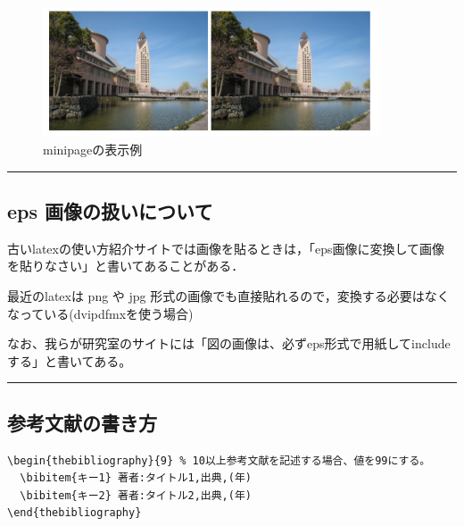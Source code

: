 \begin{figure}[htbp]
\centering
\includegraphics[width=10.00000cm]{./figures/figure2.png}
\caption{minipageの表示例}
\end{figure}

\begin{center}\rule{0.5\linewidth}{\linethickness}\end{center}

\hypertarget{eps-ux753bux50cfux306eux6271ux3044ux306bux3064ux3044ux3066}{\subsection{eps
画像の扱いについて}\label{eps-ux753bux50cfux306eux6271ux3044ux306bux3064ux3044ux3066}}

古いlatexの使い方紹介サイトでは画像を貼るときは，「eps画像に変換して画像を貼りなさい」と書いてあることがある．

最近のlatexは png や jpg
形式の画像でも直接貼れるので，変換する必要はなくなっている(dvipdfmxを使う場合)

なお、我らが研究室のサイトには「図の画像は、必ずeps形式で用紙してincludeする」と書いてある。

\begin{center}\rule{0.5\linewidth}{\linethickness}\end{center}

\hypertarget{ux53c2ux8003ux6587ux732eux306eux66f8ux304dux65b9}{\subsection{参考文献の書き方}\label{ux53c2ux8003ux6587ux732eux306eux66f8ux304dux65b9}}

\begin{lstlisting}
\begin{thebibliography}{9} % 10以上参考文献を記述する場合、値を99にする。
  \bibitem{キー1} 著者:タイトル1,出典,(年)
  \bibitem{キー2} 著者:タイトル2,出典,(年)
\end{thebibliography}
\end{lstlisting}

